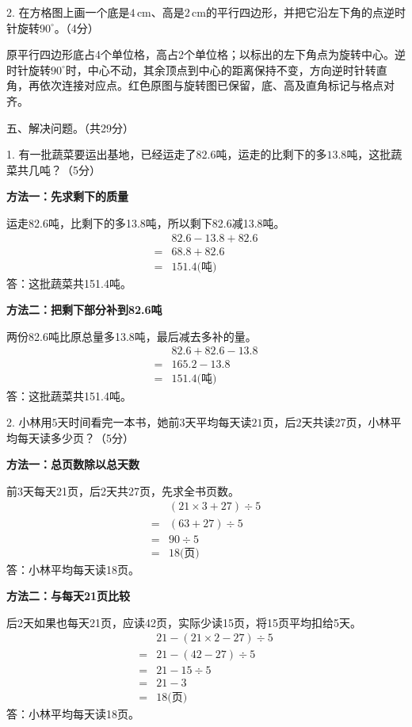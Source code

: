 2. 在方格图上画一个底是\(4\,\mathrm{cm}\)、高是\(2\,\mathrm{cm}\)的平行四边形，并把它沿左下角的点逆时针旋转\(90^\circ\)。（4分）\par
{}
\begin{BookAnswer}
原平行四边形底占4个单位格，高占2个单位格；以标出的左下角点为旋转中心。逆时针旋转\(90^\circ\)时，中心不动，其余顶点到中心的距离保持不变，方向逆时针转直角，再依次连接对应点。红色原图与旋转图已保留，底、高及直角标记与格点对齐。
\end{BookAnswer}

五、解决问题。（共29分）\par 1. 有一批蔬菜要运出基地，已经运走了\(82.6\)吨，运走的比剩下的多\(13.8\)吨，这批蔬菜共几吨？（5分）\par
\begin{BookAnswer}
\textbf{方法一：先求剩下的质量}\par 运走82.6吨，比剩下的多13.8吨，所以剩下82.6减13.8吨。\[\begin{aligned} &82.6-13.8+82.6\\ ={}&68.8+82.6\\ ={}&151.4\text{(吨)}\end{aligned}\]答：这批蔬菜共151.4吨。\par \textbf{方法二：把剩下部分补到82.6吨}\par 两份82.6吨比原总量多13.8吨，最后减去多补的量。\[\begin{aligned} &82.6+82.6-13.8\\ ={}&165.2-13.8\\ ={}&151.4\text{(吨)}\end{aligned}\]答：这批蔬菜共151.4吨。\par
\end{BookAnswer}

2. 小林用\(5\)天时间看完一本书，她前\(3\)天平均每天读\(21\)页，后\(2\)天共读\(27\)页，小林平均每天读多少页？（5分）\par
\begin{BookAnswer}
\textbf{方法一：总页数除以总天数}\par 前3天每天21页，后2天共27页，先求全书页数。\[\begin{aligned} &(21\times3+27)\div5\\ ={}&(63+27)\div5\\ ={}&90\div5\\ ={}&18\text{(页)}\end{aligned}\]答：小林平均每天读18页。\par \textbf{方法二：与每天21页比较}\par 后2天如果也每天21页，应读42页，实际少读15页，将15页平均扣给5天。\[\begin{aligned} &21-(21\times2-27)\div5\\ ={}&21-(42-27)\div5\\ ={}&21-15\div5\\ ={}&21-3\\ ={}&18\text{(页)}\end{aligned}\]答：小林平均每天读18页。\par
\end{BookAnswer}

